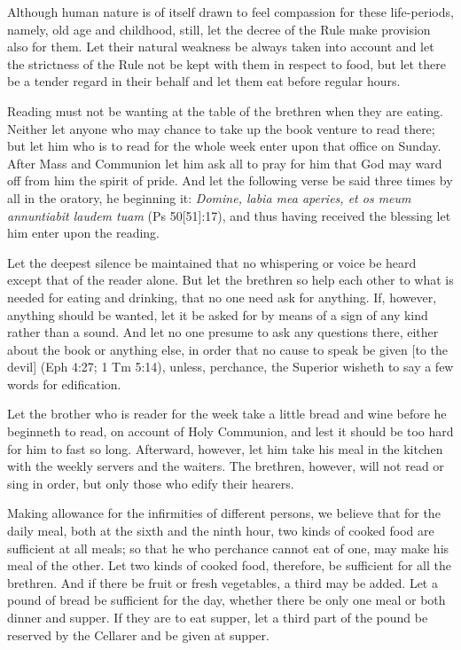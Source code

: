 Although human nature is of itself drawn to feel compassion for these life-periods, namely, old age and childhood, still, let the decree of the Rule make provision also for them. Let their natural weakness be always taken into account and let the strictness of the Rule not be kept with them in respect to food, but let there be a tender regard in their behalf and let them eat before regular hours.


Reading must not be wanting at the table of the brethren when they are eating. Neither let anyone who may chance to take up the book venture to read there; but let him who is to read for the whole week enter upon that office on Sunday. After Mass and Communion let him ask all to pray for him that God may ward off from him the spirit of pride. And let the following verse be said three times by all in the oratory, he beginning it: \emph{Domine, labia mea aperies, et os meum annuntiabit laudem tuam} (Ps 50[51]:17), and thus having received the blessing let him enter upon the reading.

Let the deepest silence be maintained that no whispering or voice be heard except that of the reader alone. But let the brethren so help each other to what is needed for eating and drinking, that no one need ask for anything. If, however, anything should be wanted, let it be asked for by means of a sign of any kind rather than a sound. And let no one presume to ask any questions there, either about the book or anything else, in order that no cause to speak be given [to the devil] (Eph 4:27; 1 Tm 5:14), unless, perchance, the Superior wisheth to say a few words for edification.

Let the brother who is reader for the week take a little bread and wine before he beginneth to read, on account of Holy Communion, and lest it should be too hard for him to fast so long. Afterward, however, let him take his meal in the kitchen with the weekly servers and the waiters. The brethren, however, will not read or sing in order, but only those who edify their hearers.


Making allowance for the infirmities of different persons, we believe that for the daily meal, both at the sixth and the ninth hour, two kinds of cooked food are sufficient at all meals; so that he who perchance cannot eat of one, may make his meal of the other. Let two kinds of cooked food, therefore, be sufficient for all the brethren. And if there be fruit or fresh vegetables, a third may be added. Let a pound of bread be sufficient for the day, whether there be only one meal or both dinner and supper. If they are to eat supper, let a third part of the pound be reserved by the Cellarer and be given at supper.

